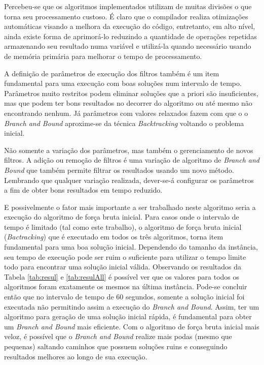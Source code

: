 \documentclass[12pt]{article}
\begin{document}
	Percebeu-se que os algoritmos implementados utilizam de muitas divisões o que torna seu processamento custoso.
	É claro que o compilador realiza otimizações automáticas visando a melhora da execução do código, entretanto, em alto nível, ainda existe forma de aprimorá-lo reduzindo a quantidade de operações repetidas armazenando seu resultado numa variável e utilizá-la quando necessário usando de memória primária para melhorar o tempo de processamento.

	A definição de parâmetros de execução dos filtros também é um item fundamental para uma execução com boas soluções num intervalo de tempo.
	Parâmetros muito restritos podem eliminar soluções que a priori são insuficientes, mas que podem ter bons resultados no decorrer do algoritmo ou até mesmo não encontrando nenhum.
	Já parâmetros com valores relaxados fazem com que o o \textit{Branch and Bound} aproxime-se da técnica \textit{Backtracking} voltando o problema inicial.

	Não somente a variação dos parâmetros, mas também o gerenciamento de novos filtros.
	A adição ou remoção de filtros é uma variação de algoritmo de \textit{Branch and Bound} que também permite filtrar os resultados usando um novo método. Lembrando que qualquer variação realizada, dever-se-á configurar os parâmetros a fim de obter bons resultados em tempo reduzido.

	E possivelmente o fator mais importante a ser trabalhado neste algoritmo seria a execução do algoritmo de força bruta inicial.
	Para casos onde o intervalo de tempo é limitado (tal como este trabalho), o algoritmo de força bruta inicial (\textit{Bactracking}) que é executado em todos os três algoritmos, torna item fundamental para uma boa solução inicial.
	Dependendo do tamanho da instância, seu tempo de execução pode ser ruim o suficiente para utilizar o tempo limite todo para encontrar uma solução inicial válida.
	Observando os resultados da Tabela \ref{tab:resul} e \ref{tab:resulAll} é possível ver que os valores para todos os algoritmos foram exatamente os mesmos na última instância. Pode-se concluir então que no intervalo de tempo de 60 segundos, somente a solução inicial foi executada não permitindo assim a execução do \textit{Branch and Bound}.
	Assim, ter um algoritmo para geração de uma solução inicial rápida, é fundamental para obter um \textit{Branch and Bound} mais eficiente. Com o algoritmo de força bruta inicial mais veloz, é possível que o \textit{Branch and Bound} realize mais podas (mesmo que pequenas) saltando caminhos que possuem soluções ruins e conseguindo resultados melhores ao longo de sua execução.
\end{document}
